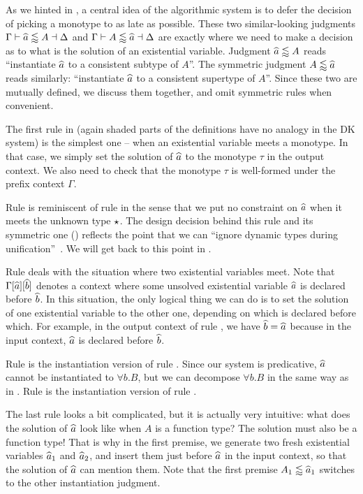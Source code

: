 As we hinted in , a central idea of the
algorithmic system is to defer the decision of picking a monotype to as late as
possible. These two similar-looking judgments $\Gamma \vdash \widehat{a} \lessapprox A
\dashv \Delta$ and $\Gamma \vdash A \lessapprox \widehat{a} \dashv \Delta$ are exactly where
we need to make a decision as to what is the solution of an existential
variable. Judgment $\widehat{a} \lessapprox A$ reads ``instantiate $\widehat{a}$ to a consistent
subtype of $A$''. The symmetric judgment $A \lessapprox \widehat{a}$ reads similarly:
``instantiate $\widehat{a}$ to a consistent supertype of $A$''. Since these two are
mutually defined, we discuss them together, and omit symmetric rules when
convenient.

The first rule  in  (again
shaded parts of the definitions have no analogy in the DK system) is the
simplest one -- when an existential variable meets a monotype. In that case, we
simply set the solution of $\widehat{a}$ to the monotype $\tau$ in the output context.
We also need to check that the monotype $\tau$ is well-formed under the prefix
context $\Gamma$.

Rule  is reminiscent of rule  in the sense
that we put no constraint on $\widehat{a}$ when it meets the unknown type $\star$.
The design decision behind this rule and its symmetric one ()
reflects the point that we can ``ignore dynamic types during
unification''~\cite{siek2008gradual}. We will get back to this point in
.

Rule  deals with the situation where two existential variables
meet. Note that $\Gamma[\widehat{a}][\widehat{b}]$ denotes a context where some unsolved existential
variable $\widehat{a}$ is declared before $\widehat{b}$. In this situation, the only logical
thing we can do is to set the solution of one existential variable to the other
one, depending on which is declared before which. For example, in the output
context of rule , we have $\widehat{b} = \widehat{a}$ because in the input
context, $\widehat{a}$ is declared before $\widehat{b}$.

Rule  is the instantiation version of rule .
Since our system is predicative, $\widehat{a}$ cannot be instantiated to $\forall b.
B$, but we can decompose $\forall b. B$ in the same way as in .
Rule  is the instantiation version of rule .


The last rule  looks a bit complicated, but it is actually very
intuitive: what does the solution of $\widehat{a}$ look like when $A$ is a function
type? The solution must also be a function type! That is why in the first
premise, we generate two fresh existential variables $\widehat{a}_1$ and $\widehat{a}_2$,
and insert them just before $\widehat{a}$ in the input context, so that the solution
of $\widehat{a}$ can mention them. Note that the first premise $A_1 \lessapprox \widehat{a}_1$
switches to the other instantiation judgment.


